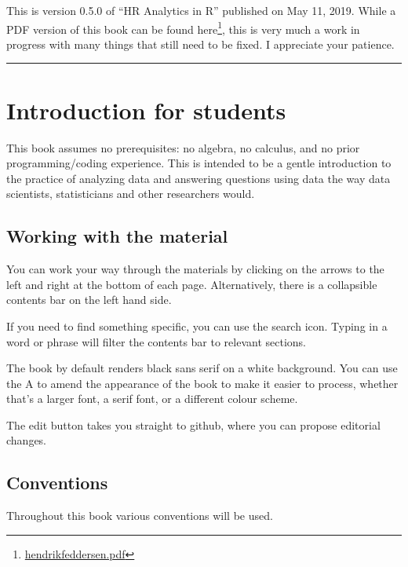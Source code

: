 \documentclass[
  12pt, krantz2,
]{krantz}
\renewcommand{\href}[2]{#2\footnote{\url{#1}}}
\begin{document}
This is version 0.5.0 of ``HR Analytics in R'' published on May 11, 2019. While a PDF version of this book can be found \href{hendrikfeddersen.pdf}{here}, this is very much a work in progress with many things that still need to be fixed. I appreciate your patience.

\begin{center}\rule{0.5\linewidth}{\linethickness}\end{center}

\hypertarget{sec:intro-for-students}{%
\section{Introduction for students}\label{sec:intro-for-students}}

This book assumes no prerequisites: no algebra, no calculus, and no prior programming/coding experience. This is intended to be a gentle introduction to the practice of analyzing data and answering questions using data the way data scientists, statisticians and other researchers would.

\hypertarget{workingwithmaterials}{%
\subsection*{Working with the material}\label{workingwithmaterials}}


You can work your way through the materials by clicking on the arrows to the left and right at the bottom of each page. Alternatively, there is a collapsible contents bar on the left hand side.

If you need to find something specific, you can use the search icon. Typing in a word or phrase will filter the contents bar to relevant sections.

The book by default renders black sans serif on a white background. You can use the A to amend the appearance of the book to make it easier to process, whether that's a larger font, a serif font, or a different colour scheme.

The edit button takes you straight to github, where you can propose editorial changes.

\hypertarget{conventions}{%
\subsection*{Conventions}\label{conventions}}


Throughout this book various conventions will be used.
\end{document}
